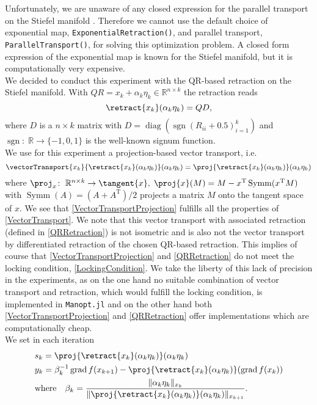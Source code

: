Unfortunately, we are unaware of any closed expression for the parallel transport on the Stiefel manifold \cite{EdelmanAriasSmith:1998}. Therefore we cannot use the default choice of exponential map, \lstinline!ExponentialRetraction()!, and parallel transport, \lstinline!ParallelTransport()!, for solving this optimization problem. A closed form expression of the exponential map is known for the Stiefel manifold, but it is computationally very expensive. \\
We decided to conduct this experiment with the QR-based retraction on the Stiefel manifold. With $Q R = x_k + \alpha_k \eta_k \in \mathbb{R}^{n \times k}$ the retraction reads
\begin{equation}\label{QRRetraction}
    \retract{x_k}(\alpha_k \eta_k) = Q D,
\end{equation}
where $D$ is a $n \times k$ matrix with $D = \operatorname{diag}({\operatorname{sgn}(R_{ii} + 0.5)}^k_{i = 1})$ and $\operatorname{sgn} \colon \; \mathbb{R} \to \{-1, 0, 1 \}$ is the well-known signum function. \\
We use for this experiment a projection-based vector transport, i.e.
\begin{equation}\label{VectorTransportProjection}
    \vectorTransport{x_k}{\retract{x_k}(\alpha_k \eta_k)}(\alpha_k \eta_k) = \proj{\retract{x_k}(\alpha_k \eta_k)} (\alpha_k \eta_k) 
\end{equation}
where $\proj_x \colon \; \mathbb{R}^{n \times k} \to \tangent{x}, \; \proj{x}(M) = M - x^{\mathrm{T}} \operatorname{Symm} (x^{\mathrm{T}}M)$ with $\operatorname{Symm}(A) = (A + A^\mathrm{T})/2$ projects a matrix $M$ onto the tangent space of $x$. We see that \cref{VectorTransportProjection} fulfills all the properties of \cref{VectorTransport}. We note that this vector transport with associated retraction (defined in \cref{QRRetraction}) is not isometric and is also not the vector transport by differentiated retraction of the chosen QR-based retraction. This implies of course that \cref{VectorTransportProjection} and \cref{QRRetraction} do not meet the locking condition, \cref{LockingCondition}. We take the liberty of this lack of precision in the experiments, as on the one hand no suitable combination of vector transport and retraction, which would fulfill the locking condition, is implemented in \lstinline!Manopt.jl! and on the other hand both \cref{VectorTransportProjection} and \cref{QRRetraction} offer implementations which are computationally cheap. \\
We set in each iteration
\begin{equation*}
    \begin{split}
        & s_k = \proj{\retract{x_k}(\alpha_k \eta_k)} (\alpha_k \eta_k) \\
        & y_k = \beta^{-1}_k \operatorname{grad} f(x_{k+1}) - \proj{\retract{x_k}(\alpha_k \eta_k)}(\operatorname{grad} f(x_k)) \\
        & \text{where} \quad \beta_k = \frac{\lVert \alpha_k \eta_k \rVert_{x_k}}{\lVert \proj{\retract{x_k}(\alpha_k \eta_k)} (\alpha_k \eta_k) \rVert_{x_{k+1}}}.
    \end{split}
\end{equation*}
